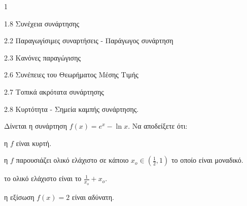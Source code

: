 \begin{ylh}{1}
    \item 1.8 Συνέχεια συνάρτησης
    \item 2.2 Παραγωγίσιμες συναρτήσεις - Παράγωγος συνάρτηση
    \item 2.3 Κανόνες παραγώγισης
    \item 2.6 Συνέπειες του Θεωρήματος Μέσης Τιμής
    \item 2.7 Τοπικά ακρότατα συνάρτησης
    \item 2.8 Κυρτότητα - Σημεία καμπής συνάρτησης.
\end{ylh}
Δίνεται η συνάρτηση $f(x)=e^x - \ln x$. Να αποδείξετε ότι:
\begin{alist}
\item η $f$ είναι κυρτή. 
\item η $f$ παρουσιάζει ολικό ελάχιστο σε κάποιο $x_o \in \left(\frac{1}{2},1\right)$ το οποίο είναι μοναδικό. 
\item το ολικό ελάχιστο είναι το $\frac{1}{x_o}+x_o$. 
\item η εξίσωση $f(x)=2$ είναι αδύνατη. 
\end{alist}